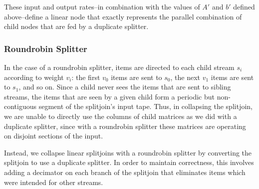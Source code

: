 These input and output rates--in combination with the values of $A'$
and $b'$ defined above--define a linear node that exactly represents
the parallel combination of child nodes that are fed by a duplicate
splitter.

\subsubsection{Roundrobin Splitter}

In the case of a roundrobin splitter, items are directed to each child
stream $s_i$ according to weight $v_i$: the first $v_0$ items are sent
to $s_0$, the next $v_1$ items are sent to $s_1$, and so on.  Since a
child never sees the items that are sent to sibling streams, the items
that are seen by a given child form a periodic but non-contiguous
segment of the splitjoin's input tape.  Thus, in collapsing the
splitjoin, we are unable to directly use the columns of child matrices
as we did with a duplicate splitter, since with a roundrobin splitter
these matrices are operating on disjoint sections of the input.

Instead, we collapse linear splitjoins with a roundrobin splitter by
converting the splitjoin to use a duplicate splitter.  In order to
maintain correctness, this involves adding a decimator on each branch
of the splitjoin that eliminates items which were intended for other
streams.

